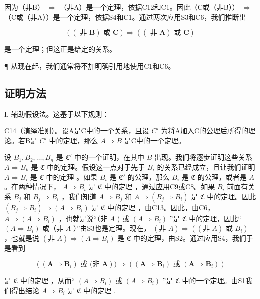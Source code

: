 因为（非B） \(\Longrightarrow\) （非A）是一个定理，依据C12和C1。因此（C或（非B）） \(\Longrightarrow\) （C或（非A））是一个定理，依据S4和C1。通过两次应用S3和C6，我们推断出

\[
((\text { 非 } \boldsymbol {B}) \text { 或 } \boldsymbol {C}) \Longrightarrow ((\text { 非 } \boldsymbol {A}) \text { 或 } \boldsymbol {C})
\]

是一个定理；但这正是给定的关系。

¶ 从现在起，我们通常将不加明确引用地使用C1和C6。

\subsection{证明方法}

I. 辅助假设法。这基于以下规则：

C14（演绎准则）。设A是C中的一个关系，且设 \(C'\) 为将A加入C的公理后所得的理论。若B是 \(C'\) 中的定理，那么 \(A \Longrightarrow B\) 是C中的一个定理。

设 \(B_1, B_2, \ldots, B_n\) 是 \(\mathfrak{C}'\) 中的一个证明，在其中 \(B\) 出现。我们将逐步证明这些关系 \(A \Longrightarrow B_k\) 是 \(\mathfrak{C}\) 中的定理。假设这一点对于先于 \(B_i\) 的关系已经成立，且让我们证明 \(A \Longrightarrow B_i\) 是 \(\mathfrak{C}\) 中的定理 。如果 \(B_i\) 是 \(\mathfrak{C}'\) 的公理，那么 \(B_i\) 是 \(\mathfrak{C}\) 的公理，或者是 \(A\) 。在两种情况下， \(A \Longrightarrow B_i\) 是 \(\mathfrak{C}\) 中的定理 ，通过应用C9或C8。如果 \(B_i\) 前面有关系 \(B_j\) 和 \(B_j \Longrightarrow B_i\) ，我们知道 \(A \Longrightarrow B_j\) 和 \(A \Longrightarrow (B_j \Longrightarrow B_i)\) 是 \(\mathfrak{C}\) 中的定理。因此 \((B_j \Longrightarrow B_i) \Longrightarrow (A \Longrightarrow B_i)\) 是 \(\mathfrak{C}\) 中的定理 ，由C13。因此，由C6， \(A \Longrightarrow (A \Longrightarrow B_i)\) ，也就是说“（非 \(A\) ) 或 \((A \Longrightarrow B_i)\) ”是 \(\mathfrak{C}\) 中的定理，因此“ \((A \Longrightarrow B_i)\) 或（非 \(A\) ）”由S3也是定理。现在， \((\text{非 } A) \Longrightarrow ((\text{非 } A) \text{ 或 } B_i)\) ，也就是说 \((\text{非 } A) \Longrightarrow (A \Longrightarrow B_i)\) 是 \(\mathfrak{C}\) 中的定理，由S2。通过应用S4，我们于是看到

\[
((\mathbf {A} \Rightarrow \mathbf {B} _ {i}) \text {   或   (非   } \mathbf {A})) \Rightarrow ((\mathbf {A} \Rightarrow \mathbf {B} _ {i}) \text {   或   } (\mathbf {A} \Rightarrow \mathbf {B} _ {i}))
\]

是 \(\mathfrak{C}\) 中的定理 ，从而“ \((A \Longrightarrow B_i)\) 或 \((A \Longrightarrow B_i)\) ”是 \(\mathfrak{C}\) 中的一个定理。由S1我们得出结论 \(A \Longrightarrow B_i\) 是 \(\mathfrak{C}\) 中的定理 .

